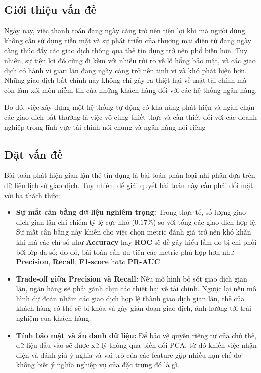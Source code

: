\subsection{Giới thiệu vấn đề}\label{subsec:gioi-thieu-van-de}
Ngày nay, việc thanh toán đang ngày càng trở nên tiện lợi khi mà người dùng không cần sử dụng tiền mặt và sự phát triển của thương mại điện tử đang ngày càng thúc đẩy các giao dịch thông qua thẻ tín dụng trở nên phổ biến hơn. Tuy nhiên, sự tiện lợi đó cũng đi kèm với nhiều rủi ro về lỗ hổng bảo mật, và các giao dịch có hành vi gian lận đang ngày càng trở nên tinh vi và khó phát hiện hơn. Những giao dịch bất chính này không chỉ gây ra thiệt hại về mặt tài chính mà còn làm xói mòn niềm tin của những khách hàng đối với các hệ thống ngân hàng. 

Do đó, việc xây dựng một hệ thống tự động có khả năng phát hiện và ngăn chặn các giao dịch bất thường là việc vô cùng thiết thực và cần thiết đối với các doanh nghiệp trong lĩnh vực tài chính nói chung và ngân hàng nói riêng 

\subsection{Đặt vấn đề}\label{subsec:dat-van-de}
Bài toán phát hiện gian lận thẻ tín dụng là bài toán phân loại nhị phân dựa trên dữ liệu lịch sử giao dịch. Tuy nhiên, để giải quyết bài toán này cần phải đối mặt với ba thách thức:
\begin{itemize}
    \item \textbf{Sự mất cân bằng dữ liệu nghiêm trọng:} Trong thực tế, số lượng giao dịch gian lận chỉ chiếm tỷ lệ cực nhỏ ($0.17\%$) so với tổng các giao dịch hợp lệ. Sự mất cân bằng này khiến cho việc chọn metric đánh giá trở nên khó khăn khi mà các chỉ số như \textbf{Accuracy} hay \textbf{ROC} sẽ dễ gây hiểu lầm do bị chi phối bởi lớp đa số; do đó, bài toán cần ưu tiên các metric phù hợp hơn như \textbf{Precision}, \textbf{Recall}, \textbf{F1-score} hoặc \textbf{PR-AUC}
    \item \textbf{Trade-off giữa Precision và Recall:} Nếu mô hình bỏ sót giao dịch gian lận, ngân hàng sẽ phải gánh chịu các thiệt hại về tài chính. Ngược lại nếu mô hình dự đoán nhầm các giao dịch hợp lệ thành giao dịch gian lận, thẻ của khách hàng có thể sẽ bị khóa và gây gián đoạn giao dịch, ảnh hưởng tới trải nghiệm của khách hàng.
    \item \textbf{Tính bảo mật và ẩn danh dữ liệu:} Để bảo vệ quyền riêng tư của chủ thẻ, dữ liệu đầu vào sẽ được xử lý thông qua biến đổi PCA, từ đó khiến việc nhận diện và đánh giá ý nghĩa và vai trò của các feature gặp nhiều hạn chế do không biết ý nghĩa nghiệp vụ của đặc trưng đó là gì.
\end{itemize}

